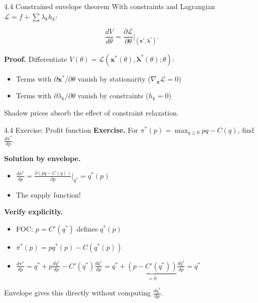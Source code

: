 \documentclass[11pt,aspectratio=169]{beamer}
\newcommand{\QFrame}[1]{\begin{frame}{#1 \quad {\small\textcolor{mAccent}{Together}}}}
\begin{document}
\begin{frame}{4.4 Constrained envelope theorem}
  \small
  With constraints and Lagrangian $\mathcal{L} = f + \sum \lambda_k h_k$:
  
  \[
    \frac{dV}{d\theta} = \frac{\partial \mathcal{L}}{\partial \theta}\Big|_{(\mathbf{x}^*, \boldsymbol{\lambda}^*)}.
  \]
  
  \textbf{Proof.} Differentiate $V(\theta) = \mathcal{L}(\mathbf{x}^*(\theta), \boldsymbol{\lambda}^*(\theta); \theta)$:
  
  \begin{itemize}
    \item Terms with $\partial \mathbf{x}^*/\partial \theta$ vanish by stationarity ($\nabla_{\mathbf{x}}\mathcal{L}=0$)
    
    \item Terms with $\partial \lambda_k/\partial \theta$ vanish by constraints ($h_k = 0$)
  \end{itemize}
  
  Shadow prices absorb the effect of constraint relaxation.
\end{frame}

\QFrame{4.4 Exercise: Profit function}
  \small
  \textbf{Exercise.} For $\pi^*(p) = \max_{q \geq 0} pq - C(q)$, find $\frac{d\pi^*}{dp}$.
  
  \textbf{Solution by envelope.}
  
  \begin{itemize}
    \item $\frac{d\pi^*}{dp} = \frac{\partial(pq - C(q))}{\partial p}\big|_{q^*} = q^*(p)$
    
    \item The supply function!
  \end{itemize}
  
  \textbf{Verify explicitly.}
  
  \begin{itemize}
    \item FOC: $p = C'(q^*)$ defines $q^*(p)$
    
    \item $\pi^*(p) = pq^*(p) - C(q^*(p))$
    
    \item $\frac{d\pi^*}{dp} = q^* + p\frac{dq^*}{dp} - C'(q^*)\frac{dq^*}{dp} = q^* + \underbrace{(p - C'(q^*))}_{=0}\frac{dq^*}{dp} = q^*$
  \end{itemize}
  
  Envelope gives this directly without computing $\frac{dq^*}{dp}$.
\end{frame}
\end{document}
